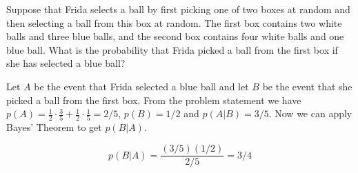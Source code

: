 \documentclass[../main.tex]{subfiles}
\begin{document}
Suppose that Frida selects a ball by first picking one of two boxes at random and then selecting a ball from this box at random.
The first box contains two white balls and three blue balls, and the second box contains four white balls and one blue ball.
What is the probability that Frida picked a ball from the first box if she has selected a blue ball?

\solution

Let $A$ be the event that Frida selected a blue ball and let $B$ be the event that she picked a ball from the first box.
From the problem statement we have $p(A) = \frac{1}{2}\cdot\frac{3}{5} + \frac{1}{2}\cdot\frac{1}{5} = 2/5$, $p(B) = 1/2$ and $p(A|B) = 3/5$. Now we can apply Bayes' Theorem
to get $p(B|A)$.

\[ p(B|A) = \frac{(3/5)(1/2)}{2/5} = 3/4 \]
\end{document}
